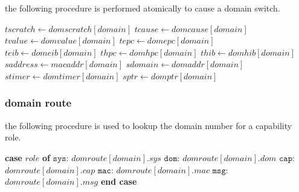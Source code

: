 \par\noindent
the following procedure is performed atomically to cause a domain switch.

\begin{algorithm}[H]
\footnotesize
\caption{switch system state to new domain}
\begin{algorithmic}[1]
    \State $\mathit{tscratch}\gets \mathit{domscratch[domain]}$
    \State $\mathit{tcause}\gets \mathit{domcause[domain]}$
    \State $\mathit{tvalue} \gets \mathit{domvalue[domain]}$
    \State $\mathit{tepc} \gets \mathit{domepc[domain]}$
    \State $\mathit{teib} \gets \mathit{domeib[domain]}$
    \State $\mathit{thpc} \gets \mathit{domhpc[domain]}$
    \State $\mathit{thib} \gets \mathit{domhib[domain]}$
    \State $\mathit{saddress} \gets \mathit{macaddr[domain]}$
    \State $\mathit{sdomain} \gets \mathit{domaddr[domain]}$
    \State $\mathit{stimer} \gets \mathit{domtimer[domain]}$
    \State $\mathit{sptr} \gets \mathit{domptr[domain]}$
\EndFunction
\end{algorithmic}
\end{algorithm}

\newpage
\subsubsection{domain route}

\par\noindent
the following procedure is used to lookup the domain number for a capability role.

\begin{algorithm}[H]
\footnotesize
\caption{return domain number for a capability role}
\begin{algorithmic}[1]
    \State \Return \textbf{case} $\mathit{role}$ \textbf{of}
    \State \hspace{1em} $\mathtt{sys}$: $\mathit{domroute[domain].sys}$
    \State \hspace{1em} $\mathtt{dom}$: $\mathit{domroute[domain].dom}$
    \State \hspace{1em} $\mathtt{cap}$: $\mathit{domroute[domain].cap}$
    \State \hspace{1em} $\mathtt{mac}$: $\mathit{domroute[domain].mac}$
    \State \hspace{1em} $\mathtt{msg}$: $\mathit{domroute[domain].msg}$
    \State \textbf{end case}
\EndFunction
\end{algorithmic}
\end{algorithm}

